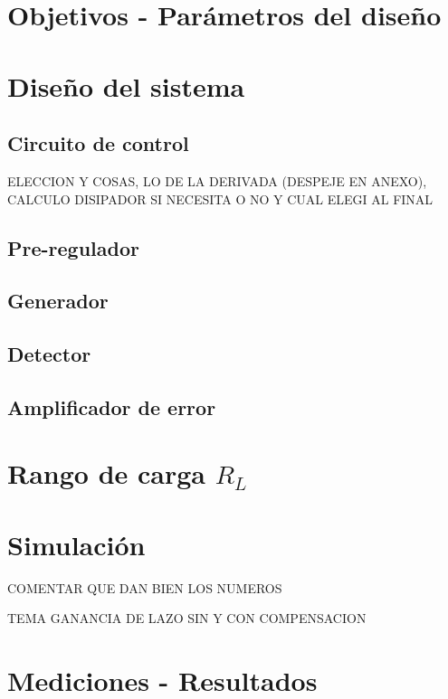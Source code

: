 



\tableofcontents
\newpage

\section{Objetivos - Par\'ametros del dise\~no}

\section{Dise\~no del sistema}
\subsection{Circuito de control}

ELECCION Y COSAS, LO DE LA DERIVADA (DESPEJE EN ANEXO), CALCULO DISIPADOR SI NECESITA O  NO Y CUAL ELEGI AL FINAL

\subsection{Pre-regulador}

\subsection{Generador}

\subsection{Detector}

\subsection{Amplificador de error}

\section{Rango de carga $R_L$}


\section{Simulación}

COMENTAR QUE DAN BIEN LOS NUMEROS \par
TEMA GANANCIA DE LAZO SIN Y CON COMPENSACION

\section{Mediciones - Resultados}

